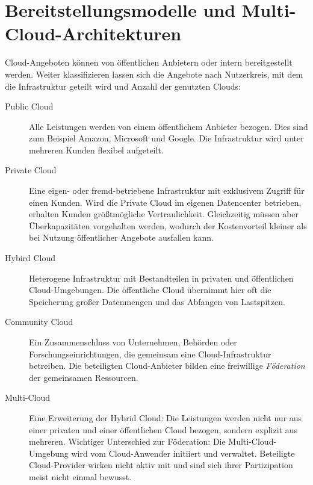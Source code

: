 
\section{Bereitstellungsmodelle und Multi-Cloud-Architekturen}

Cloud-Angeboten können von öffentlichen Anbietern oder intern bereitgestellt werden. Weiter klassifizieren lassen sich die Angebote nach Nutzerkreis, mit dem die Infrastruktur geteilt wird und Anzahl der genutzten Clouds:

\begin{description}
	
	\item[Public Cloud] Alle Leistungen werden von einem öffentlichem Anbieter bezogen. Dies sind zum Beispiel Amazon, Microsoft und Google. Die Infrastruktur wird unter mehreren Kunden flexibel aufgeteilt.
	
	\item[Private Cloud] Eine eigen- oder fremd-betriebene Infrastruktur mit exklusivem Zugriff für einen Kunden. Wird die Private Cloud im eigenen Datencenter betrieben, erhalten Kunden größtmögliche Vertraulichkeit. Gleichzeitig müssen aber Überkapazitäten vorgehalten werden, wodurch der Kostenvorteil kleiner als bei Nutzung öffentlicher Angebote ausfallen kann.
	
	\item[Hybird Cloud] Heterogene Infrastruktur mit Bestandteilen in privaten und öffentlichen Cloud-Umgebungen. Die öffentliche Cloud übernimmt hier oft die Speicherung großer Datenmengen und das Abfangen von Lastspitzen.
	
	\item[Community Cloud] Ein Zusammenschluss von Unternehmen, Behörden oder Forschungseinrichtungen, die gemeinsam eine Cloud-Infrastruktur betreiben. Die beteiligten Cloud-Anbieter bilden eine freiwillige \emph{Föderation} der gemeinsamen Ressourcen.
	
	\item[Multi-Cloud] Eine Erweiterung der Hybrid Cloud: Die Leistungen werden nicht nur aus einer privaten und einer öffentlichen Cloud bezogen, sondern explizit aus mehreren. Wichtiger Unterschied zur Föderation: Die Multi-Cloud-Umgebung wird vom Cloud-Anwender initiiert und verwaltet. Beteiligte Cloud-Provider wirken nicht aktiv mit und sind sich ihrer Partizipation meist nicht einmal bewusst.
	
\end{description}

